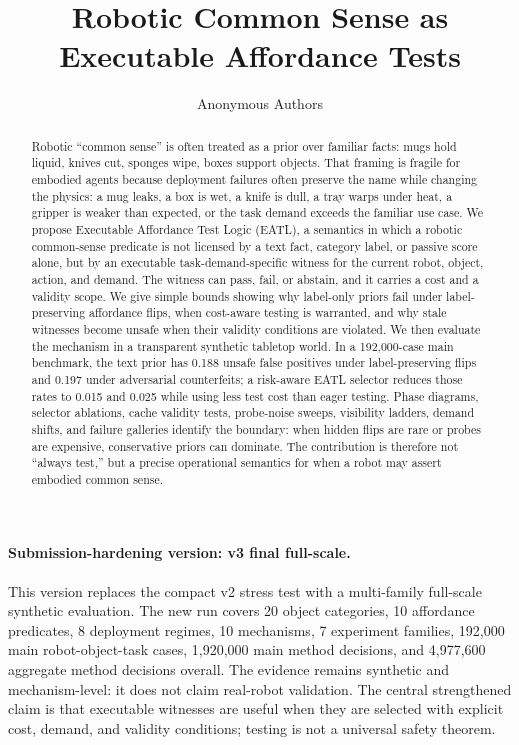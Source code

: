 \documentclass{article}
\title{Robotic Common Sense as Executable Affordance Tests}
\author{Anonymous Authors}
\begin{document}
\maketitle

\paragraph{Submission-hardening version: v3 final full-scale.}
This version replaces the compact v2 stress test with a multi-family
full-scale synthetic evaluation.  The new run covers 20 object categories, 10
affordance predicates, 8 deployment regimes, 10 mechanisms, 7 experiment
families, 192,000 main robot-object-task cases, 1,920,000 main method decisions,
and 4,977,600 aggregate method decisions overall.  The evidence remains
synthetic and mechanism-level: it does not claim real-robot validation.  The
central strengthened claim is that executable witnesses are useful when they
are selected with explicit cost, demand, and validity conditions; testing is
not a universal safety theorem.

\begin{abstract}
Robotic ``common sense'' is often treated as a prior over familiar facts: mugs
hold liquid, knives cut, sponges wipe, boxes support objects.  That framing is
fragile for embodied agents because deployment failures often preserve the name
while changing the physics: a mug leaks, a box is wet, a knife is dull, a tray
warps under heat, a gripper is weaker than expected, or the task demand exceeds
the familiar use case.  We propose Executable Affordance Test Logic (EATL), a
semantics in which a robotic common-sense predicate is not licensed by a text
fact, category label, or passive score alone, but by an executable
task-demand-specific witness for the current robot, object, action, and demand.
The witness can pass, fail, or abstain, and it carries a cost and a validity
scope.  We give simple bounds showing why label-only priors fail under
label-preserving affordance flips, when cost-aware testing is warranted, and
why stale witnesses become unsafe when their validity conditions are violated.
We then evaluate the mechanism in a transparent synthetic tabletop world.  In a
192,000-case main benchmark, the text prior has 0.188 unsafe false positives
under label-preserving flips and 0.197 under adversarial counterfeits; a
risk-aware EATL selector reduces those rates to 0.015 and 0.025 while using
less test cost than eager testing.  Phase diagrams, selector ablations, cache
validity tests, probe-noise sweeps, visibility ladders, demand shifts, and
failure galleries identify the boundary: when hidden flips are rare or probes
are expensive, conservative priors can dominate.  The contribution is therefore
not ``always test,'' but a precise operational semantics for when a robot may
assert embodied common sense.
\end{abstract}
\end{document}
